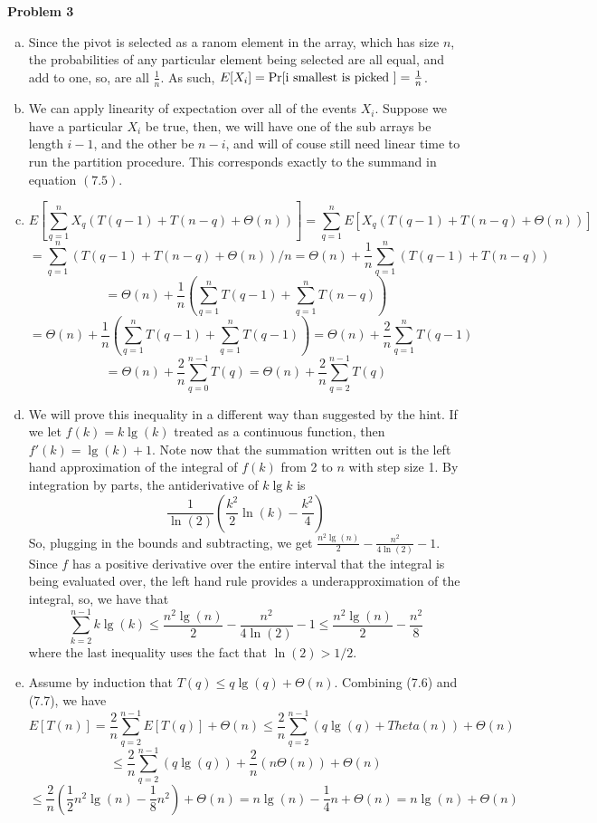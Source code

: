 \documentclass{article}
\begin{document}
\noindent\textbf{Problem 3}\\
\begin{enumerate}[a.]
\item
Since the pivot is selected as a ranom element in the array, which has size $n$, the probabilities of any particular element being selected are all equal, and add to one, so, are all $\frac{1}{n}$. As such, $E[X_i] = \Pr[\hbox{i smallest is picked }] = \frac{1}{n}$.

\item
We can apply linearity of expectation over all of the events $X_i$. Suppose we have a particular $X_i$ be true, then, we will have one of the sub arrays be length $i-1$, and the other be $n-i$, and will of couse still need linear time to run the partition procedure. This corresponds exactly to the summand in equation $(7.5)$.

\item
\[
E\left[\sum_{q=1}^{n}X_q(T(q-1) + T(n-q) + \Theta(n))\right] = \sum_{q=1}^{n} E\left[X_q(T(q-1) + T(n-q) + \Theta(n))\right] \]\[= \sum_{q=1}^{n}(T(q-1) + T(n-q) + \Theta(n))/n = \Theta(n) +  \frac{1}{n} \sum_{q=1}^{n}(T(q-1) + T(n-q) ) \]\[= \Theta(n) + \frac{1}{n} \left(  \sum_{q=1}^{n}T(q-1) +  \sum_{q=1}^{n}T(n-q)\right) \]\[= \Theta(n) + \frac{1}{n} \left(  \sum_{q=1}^{n}T(q-1) +  \sum_{q=1}^{n}T(q-1)\right) = \Theta(n) + \frac{2}{n} \sum_{q=1}^{n}T(q-1) \]\[= \Theta(n) + \frac{2}{n} \sum_{q=0}^{n-1}T(q) = \Theta(n) + \frac{2}{n} \sum_{q=2}^{n-1}T(q)\]

\item

We will prove this inequality in a different way than suggested by the hint. If we let $f(k) = k\lg(k)$ treated as a continuous function, then $f'(k) = \lg(k) + 1$. Note now that the summation written out is the left hand approximation of the integral of $f(k)$ from 2 to $n$ with step size 1. By integration by parts, the antiderivative of $k\lg k$ is 
\[
\frac{1}{\ln(2)}\left(\frac{k^2}{2}\ln(k) - \frac{k^2}{4} \right)
\]
So, plugging in the bounds and subtracting, we get $\frac{n^2 \lg(n)}{2} - \frac{n^2}{4\ln(2)} - 1$. Since $f$ has a positive derivative over the entire interval that the integral is being evaluated over, the left hand rule provides a underapproximation of the integral, so, we have that 
\[
\sum_{k=2}^{n-1} k\lg(k) \le \frac{n^2 \lg(n)}{2} - \frac{n^2}{4\ln(2)} - 1 \le \frac{n^2 \lg(n)}{2} - \frac{n^2}{8} 
\]
where the last inequality uses the fact that $\ln(2)>1/2$.

\item
Assume by induction that $T(q) \le q\lg(q)+\Theta(n)$. Combining (7.6) and (7.7), we have
\[
E[T(n)] = \frac{2}{n} \sum_{q=2}^{n-1} E[T(q)] + \Theta(n) \le \frac{2}{n} \sum_{q=2}^{n-1} (q\lg(q) + Theta(n)) + \Theta(n) \]\[\le \frac{2}{n} \sum_{q=2}^{n-1} (q\lg(q)) + \frac{2}{n}(n\Theta(n)) + \Theta(n)\]\[   \le \frac{2}{n} (\frac{1}{2} n^2 \lg(n) -\frac{1}{8} n^2) + \Theta(n) = n\lg(n) - \frac{1}{4} n+ \Theta(n) = n\lg(n) +\Theta(n)
\]

\end{enumerate}
\end{document}

